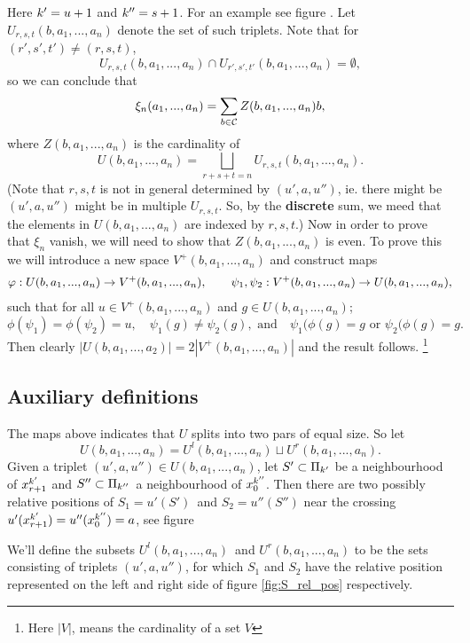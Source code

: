 Here ${k'} = u+1$ and ${k''} = s+1$. For an example see figure . Let $U_{r,s,t}(b,a_1,...,a_n)$ denote the set of such triplets. Note that for $(r',s',t') \ne (r,s,t)$, 
\[ U_{r,s,t}(b,a_1,...,a_n) \cap U_{r',s',t'}(b,a_1,...,a_n) = \emptyset, \]
so we can conclude that 
\[ \xi_n(a_1,...,a_n) = \sum_{b\in\mathcal{C}} Z(b,a_1,...,a_n) b, \] 
where $Z(b,a_1,...,a_n)$ is the cardinality of
\[ U(b,a_1,...,a_n) = \bigsqcup_{r+s+t=n} U_{r,s,t}(b,a_1,...,a_n). \] 
(Note that $r,s,t$ is not in general determined by $(u',a,u'')$, ie. there
might be $(u',a,u'')$ might be in multiple $U_{r,s,t}$. So, by the
\textbf{discrete} sum, we meed that the elements in $U(b,a_1,...,a_n)$ are
indexed by $r,s,t$.)
%
Now in order to prove that $\xi_n$ vanish, we will need to show that
$Z(b,a_1,...,a_n)$ is even. To prove this we will introduce a new space 
$V^+(b,a_1,..., a_n)$ and construct maps 
\begin{align*}
\varphi: U(b, a_1, ..., a_n) \to V^+(b, a_1, ..., a_n), \qquad
\psi_1, \psi_2: V^+(b, a_1, ..., a_n) \to U(b, a_1, ..., a_n),
\end{align*}
such that for all $u \in V^+(b, a_1, ..., a_n)$ and $g \in U(b, a_1, ..., a_n)$;
\[     \phi(\psi_1) = \phi(\psi_2) = u,
\quad  \psi_1(g) \ne \psi_2(g),\text{ and} 
\quad  \psi_1(\phi(g) = g\text{ or }\psi_2(\phi(g) = g. \]
Then clearly $|U(b,a_1,...,a_2)| = 2|V^+(b,a_1,...,a_n)|$ and the result follows.
\footnote{Here $|V|$, means the cardinality of a set $V$}

\subsection{Auxiliary definitions}
\newcommand{\hu}{\hat{u}}
The maps above indicates that $U$ splits into two pars of equal size. So let
\[  U(b,a_1,...,a_n) = U^l(b,a_1,...,a_n) \sqcup U^r(b,a_1,...,a_n). \] 
Given a triplet $(u',a,u'') \in U(b,a_1,...,a_n)$, let $S'\subset \Pi_{k'}$ be a
neighbourhood of $x^{k'}_{r+1}$ and $S'' \subset \Pi_{k''}$ a neighbourhood of
$x^{k''}_0$. Then there are two possibly relative positions of $S_1 = u'(S')$ and
$S_2 = u''(S'')$ near the crossing $u'(x^{k'}_{r+1}) = u''(x^{k''}_0) = a$, see figure

\begin{defn}
We'll define the subsets $U^l(b,a_1,...,a_n)$ and $U^r(b,a_1,...,a_n)$ to be the
sets consisting of triplets $(u',a,u'')$, for which $S_1$ and $S_2$ have the
relative position represented on the left and right side of figure
\ref{fig:S_rel_pos} respectively. 
\end{defn}

